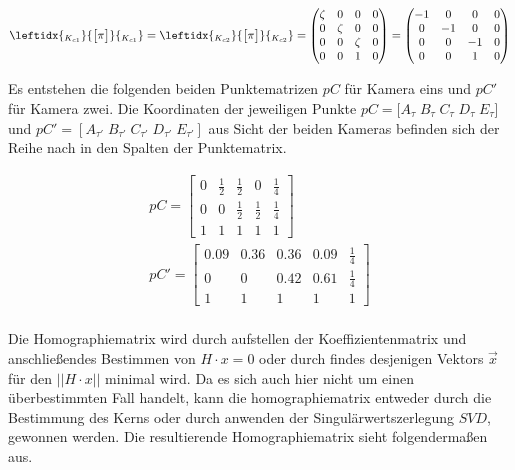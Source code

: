 \begin{gather}
	\leftidx{_{K_{c1}}}{\begin{bmatrix}
			\pi
	\end{bmatrix}}{_{K_{c1}}}
	=		\leftidx{_{K_{c2}}}{\begin{bmatrix}
			\pi
	\end{bmatrix}}{_{K_{c2}}}
	=
	\begin{pmatrix}
		\zeta&0&0&0\\
		0&\zeta&0&0\\
		0&0&\zeta&0\\
		0&0&1&0
	\end{pmatrix}=
	\begin{pmatrix}
		-1&0&0&0\\
		0&-1&0&0\\
		0&0&-1&0\\
		0&0&1&0
	\end{pmatrix}
\end{gather}

Es entstehen die folgenden beiden Punktematrizen $pC$ für Kamera eins und $pC'$ für Kamera zwei. Die Koordinaten der jeweiligen Punkte $ pC = [A_\tau \;B_\tau\;C_\tau\;D_\tau\;E_\tau$] und $pC' =[A_{\tau'}\;B_{\tau'}\;C_{\tau'}\;D_{\tau'}\;E_{\tau'}]$ aus Sicht der beiden Kameras befinden sich der Reihe nach in den Spalten der Punktematrix.

\begin{gather}
	pC = 
	\begin{bmatrix}
		0&\frac{1}{2}&\frac{1}{2}&0&\frac{1}{4}\\
		0&0&\frac{1}{2}&\frac{1}{2}&\frac{1}{4}\\
		1&1&1&1&1
	\end{bmatrix}\\
	pC'=
	\begin{bmatrix}
		0.09&0.36&0.36&0.09&\frac{1}{4}\\
		0&0&0.42&0.61&\frac{1}{4}\\
		1&1&1&1&1
	\end{bmatrix}\\
\end{gather}

Die Homographiematrix wird durch aufstellen der Koeffizientenmatrix und anschließendes Bestimmen von $H \cdot x = 0$ oder durch findes desjenigen Vektors $\vec{x}$ für den $||H\cdot x||$ minimal wird. Da es sich auch hier nicht um einen überbestimmten Fall handelt, kann die homographiematrix entweder durch die Bestimmung des Kerns oder durch anwenden der Singulärwertszerlegung $SVD$, gewonnen werden. Die resultierende Homographiematrix sieht folgendermaßen aus.

